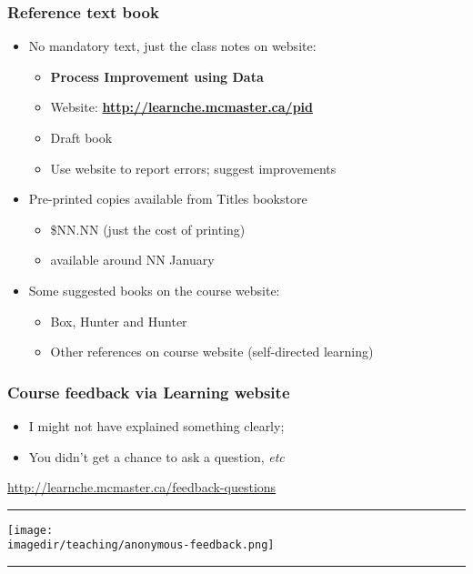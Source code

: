 \begin{frame}\frametitle{Reference text book}
	
	\begin{itemize}
		\item	No mandatory text, just the class notes on website: 
		\begin{itemize}
			\item	\textbf{Process Improvement using Data} 
			\item	Website: \textbf{\href{http://learnche.mcmaster.ca/pid?source=4C3-admin-notes}{http://learnche.mcmaster.ca/pid}} 
			\item	Draft book 
			\item	Use website to report errors; suggest improvements 
		\end{itemize}
	\end{itemize}
	\begin{itemize}
		\item	Pre-printed copies available from Titles bookstore 
		\begin{itemize}
			\item	\$NN.NN (just the cost of printing) 
			\item	available around NN January 
		\end{itemize}
	\end{itemize}
	\begin{itemize}
		\item	Some suggested books on the course website: 
		\begin{itemize}
			\item	Box, Hunter and Hunter
			\item	Other references on course website (self-directed learning)
		\end{itemize}
	\end{itemize}
\end{frame}

\begin{frame}\frametitle{Course feedback via Learning website}
	\begin{itemize}
		\item	I might not have explained something clearly;
		\item	You didn't get a chance to ask a question, \emph{etc}
	\end{itemize}
	\href{http://learnche.mcmaster.ca/feedback-questions}{http://learnche.mcmaster.ca/feedback-questions}
	\vspace{12pt}
	\hrule
	\begin{center}
		\texttt{[image: \\imagedir/teaching/anonymous-feedback.png]}
	\end{center}
	\hrule
\end{frame}

